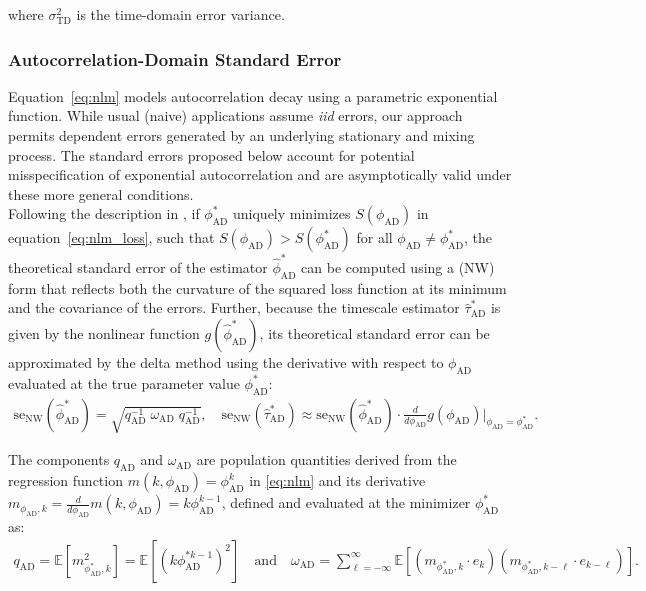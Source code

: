 \documentclass[9pt]{article}
\newcommand{\sigmatd}{\sigma_{\scriptscriptstyle\text{TD}}}
\newcommand{\phiad}{\phi_{\scriptscriptstyle\text{AD}}}
\newcommand{\hatphiad}{\hat{\phi}^*_{\scriptscriptstyle\text{AD}}}
\newcommand{\hattauad}{\hat{\tau}^*_{\scriptscriptstyle\text{AD}}}
\newcommand{\qad}{q_{\scriptscriptstyle\text{AD}}}
\newcommand{\omegaad}{\omega_{\scriptscriptstyle\text{AD}}}
\begin{document}
\noindent where $\sigmatd^2$ is the time-domain error variance. \\

\subsubsection{Autocorrelation-Domain Standard Error}\label{sec:stderr-autocorrelation-domain}
Equation~\eqref{eq:nlm} models autocorrelation decay using a parametric exponential function. While usual (naive) applications assume \textit{iid} errors, our approach permits dependent errors generated by an underlying stationary and mixing process. The standard errors proposed below account for potential misspecification of exponential autocorrelation and are asymptotically valid under these more general conditions.\\

Following the description in \citet[Chapter~22.8 and Chapter~23.5]{hansen_econometrics_2022}, if $\phiad^*$ uniquely minimizes $S(\phiad)$ in equation~\eqref{eq:nlm_loss}, such that $S(\phiad) > S(\phiad^*)$ for all $\phiad \neq \phiad^*$, the theoretical standard error of the estimator $\hatphiad$ can be computed using a \citet{newey_simple_1987} (NW) form that reflects both the curvature of the squared loss function at its minimum and the covariance of the errors. Further, because the timescale estimator $\hattauad$ is given by the nonlinear function $g(\hatphiad)$, its theoretical standard error can be approximated by the delta method using the derivative with respect to $\phiad$ evaluated at the true parameter value $\phiad^*$:
\begin{align}\label{eq:stderr-autocorrelation-domain}
    \text{se}_\text{NW}(\hatphiad) = \sqrt{\qad^{-1}\; \omegaad \;\qad^{-1}}, \quad \text{se}_\text{NW}(\hattauad) \approx \text{se}_\text{NW}(\hatphiad) \cdot \frac{d}{d\phiad}g(\phiad)\big|_{\phiad=\phiad^*}.
\end{align}

\noindent The components $\qad$ and $\omegaad$ are population quantities derived from the regression function $m(k, \phiad) = \phiad^k$ in \eqref{eq:nlm} and its derivative $m_{\phiad, k} = \frac{d}{d\phiad} m(k, \phiad) = k \phiad^{k-1}$, defined and evaluated at the minimizer $\phiad^*$ as:
\begin{align}\label{eq:ad-qomega}
    \qad = \mathbb{E}[m_{\phiad^*, k}^2] = \mathbb{E}[(k \phiad^{*k-1})^2] \quad\text{and}\quad
    \omegaad = \sum_{\ell=-\infty}^{\infty} \mathbb{E}[(m_{\phiad^*, k} \cdot e_{k})(m_{\phiad^*, k-\ell} \cdot e_{k-\ell})].
\end{align}
\end{document}
